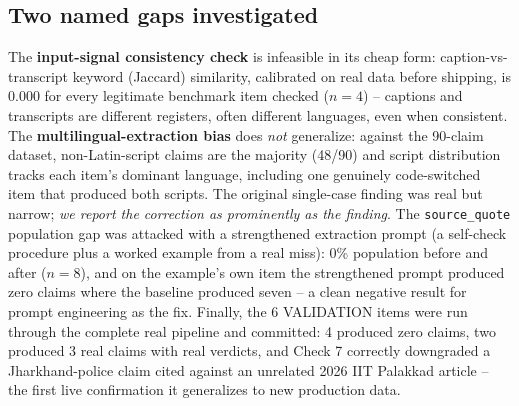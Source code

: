 \documentclass[conference]{IEEEtran}
\begin{document}
\subsection{Two named gaps investigated}
\label{sec:followup}
The \textbf{input-signal consistency check} is infeasible in its cheap
form: caption-vs-transcript keyword (Jaccard) similarity, calibrated on
real data before shipping, is 0.000 for every legitimate benchmark item
checked ($n=4$) -- captions and transcripts are different registers,
often different languages, even when consistent. The
\textbf{multilingual-extraction bias} does \emph{not} generalize:
against the 90-claim dataset, non-Latin-script claims are the majority
(48/90) and script distribution tracks each item's dominant language,
including one genuinely code-switched item that produced both scripts.
The original single-case finding was real but narrow; \emph{we report
the correction as prominently as the finding}. The \texttt{source\_quote}
population gap was attacked with a strengthened extraction prompt (a
self-check procedure plus a worked example from a real miss): 0\%
population before and after ($n=8$), and on the example's own item the
strengthened prompt produced zero claims where the baseline produced
seven -- a clean negative result for prompt engineering as the fix.
Finally, the 6 VALIDATION items were run through the complete real
pipeline and committed: 4 produced zero claims, two produced 3 real
claims with real verdicts, and Check 7 correctly downgraded a
Jharkhand-police claim cited against an unrelated 2026 IIT Palakkad
article -- the first live confirmation it generalizes to new production
data.
\end{document}
